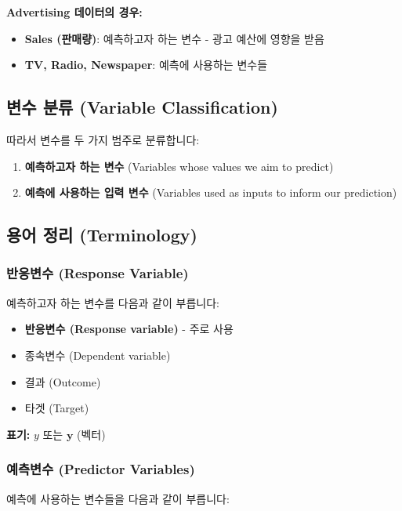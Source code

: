 \documentclass[12pt,a4paper]{article}
\begin{document}
\textbf{Advertising 데이터의 경우:}
\begin{itemize}
    \item \textbf{Sales (판매량)}: 예측하고자 하는 변수 - 광고 예산에 영향을 받음
    \item \textbf{TV, Radio, Newspaper}: 예측에 사용하는 변수들
\end{itemize}

\subsection{변수 분류 (Variable Classification)}

따라서 변수를 두 가지 범주로 분류합니다:

\begin{enumerate}
    \item \textbf{예측하고자 하는 변수} (Variables whose values we aim to predict)
    \item \textbf{예측에 사용하는 입력 변수} (Variables used as inputs to inform our prediction)
\end{enumerate}

\subsection{용어 정리 (Terminology)}

\subsubsection{반응변수 (Response Variable)}

예측하고자 하는 변수를 다음과 같이 부릅니다:

\begin{itemize}
    \item \textbf{반응변수 (Response variable)} - 주로 사용
    \item 종속변수 (Dependent variable)
    \item 결과 (Outcome)
    \item 타겟 (Target)
\end{itemize}

\textbf{표기:} $y$ 또는 $\mathbf{y}$ (벡터)

\subsubsection{예측변수 (Predictor Variables)}

예측에 사용하는 변수들을 다음과 같이 부릅니다:
\end{document}
